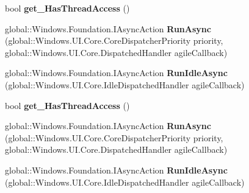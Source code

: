 \begin{DoxyCompactItemize}
\item 
\mbox{\label{interface_windows_1_1_u_i_1_1_core_1_1_i_core_dispatcher_afa093aa300664f3cfede7c8fac27c3ec}} 
bool {\bfseries get\+\_\+\+Has\+Thread\+Access} ()
\item 
\mbox{\label{interface_windows_1_1_u_i_1_1_core_1_1_i_core_dispatcher_a466ce1d7a05e82289c0c50e1e6738da8}} 
global\+::\+Windows.\+Foundation.\+I\+Async\+Action {\bfseries Run\+Async} (global\+::\+Windows.\+U\+I.\+Core.\+Core\+Dispatcher\+Priority priority, global\+::\+Windows.\+U\+I.\+Core.\+Dispatched\+Handler agile\+Callback)
\item 
\mbox{\label{interface_windows_1_1_u_i_1_1_core_1_1_i_core_dispatcher_a58bf641f5f0e68594918acca63694bb4}} 
global\+::\+Windows.\+Foundation.\+I\+Async\+Action {\bfseries Run\+Idle\+Async} (global\+::\+Windows.\+U\+I.\+Core.\+Idle\+Dispatched\+Handler agile\+Callback)
\item 
\mbox{\label{interface_windows_1_1_u_i_1_1_core_1_1_i_core_dispatcher_afa093aa300664f3cfede7c8fac27c3ec}} 
bool {\bfseries get\+\_\+\+Has\+Thread\+Access} ()
\item 
\mbox{\label{interface_windows_1_1_u_i_1_1_core_1_1_i_core_dispatcher_a466ce1d7a05e82289c0c50e1e6738da8}} 
global\+::\+Windows.\+Foundation.\+I\+Async\+Action {\bfseries Run\+Async} (global\+::\+Windows.\+U\+I.\+Core.\+Core\+Dispatcher\+Priority priority, global\+::\+Windows.\+U\+I.\+Core.\+Dispatched\+Handler agile\+Callback)
\item 
\mbox{\label{interface_windows_1_1_u_i_1_1_core_1_1_i_core_dispatcher_a58bf641f5f0e68594918acca63694bb4}} 
global\+::\+Windows.\+Foundation.\+I\+Async\+Action {\bfseries Run\+Idle\+Async} (global\+::\+Windows.\+U\+I.\+Core.\+Idle\+Dispatched\+Handler agile\+Callback)
\item 
\mbox{\label{interface_windows_1_1_u_i_1_1_core_1_1_i_core_dispatcher_afa093aa300664f3cfede7c8fac27c3ec}} 

\end{DoxyCompactItemize}

